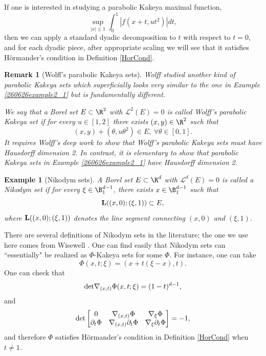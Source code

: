 \documentclass{article}
\numberwithin{equation}{section}
\theoremstyle{plain}
\newtheorem{remark}[theorem]{Remark}
\newtheorem{example}[theorem]{Example}
\begin{document}
If one is interested in studying a parabolic Kakeya maximal function, 
\begin{equation}\label{260309e2_4}
    \sup_{|x|\le 1} \int_0^1 
    |f(x+ t, u t^2)| dt,
\end{equation}
then we can apply a standard dyadic decomposition to $t$ with respect to $t=0$, and for each dyadic piece, after appropriate scaling we will see that it satisfies H\"ormander's condition in Definition \ref{HorCond}. 
	

	
	
	\begin{remark}[Wolff's parabolic Kakeya sets]\label{Wolff_Parabolic}
		Wolff \cite{Wol97} studied another kind of parabolic Kakeya sets which superficially looks very similar to the one in Example \ref{260626example2_1} but is fundamentally different. 
		
		We say that a Borel set $E\subset \R^2$ with $\mathcal{L}^2(E)=0$ is called Wolff's parabolic Kakeya set if for every $u\in [1, 2]$ there exists $(x, y)\in \R^2$ such that 
		\begin{equation}\label{le1.4}
			(x, y)+ (\theta, u\theta^2)\in E, \ \forall \theta\in [0, 1].
		\end{equation}
		It requires Wolff's deep work \cite{Wol97} to show that Wolff's parabolic Kakeya sets must have Hausdorff dimension 2. In contrast, it is elementary to show that parabolic Kakeya sets in Example \ref{260626example2_1} have Hausdorff dimension 2. 
	\end{remark}
	



	\begin{example}
		[Nikodym sets]A Borel set $E\subset \R^d$ with $\mathcal{L}^d(E)=0$ is called a Nikodym set if for every $\xi\in \B^{d-1}_1$, there exists $x\in \B^{d-1}_1$ such that 
		\begin{equation}
			{\bf L}({(x, 0); (\xi, 1)})\subset E,
		\end{equation}
		where ${\bf L}({(x, 0); (\xi, 1)})$ denotes the line segment connecting $(x, 0)$ and $(\xi, 1)$.
	\end{example}
	
	 There are several definitions of Nikodym sets in the literature; the one we use here comes from Wisewell \cite{Wis05}. One can find easily that Nikodym sets can ``essentially" be realized as $\Phi$-Kakeya sets for some $\Phi$. For instance, one can take 
	\[
	\Phi(x, t; \xi)= 
	(x+ t(\xi-x), t).
	\] 
	One can check that
	\begin{equation}\label{260309eaa}
	{\rm det} \nabla_{(x, t)} \Phi(x, t; \xi)= (1-t)^{d-1},
	\end{equation}
	and 
	$$
	{\rm det}	\begin{bmatrix}
		0 & \nabla_{(x, t)}\Phi & \nabla_{\xi}\Phi\\
		\partial_t \Phi & \nabla_{(x, t)}\partial_t \Phi & \nabla_{\xi}\partial_t\Phi
	\end{bmatrix}
	= -1,
	$$	
	and therefore $\Phi$ satisfies H\"ormander's condition in Definition \ref{HorCond} when $t\neq 1$. 
	
\end{document}
